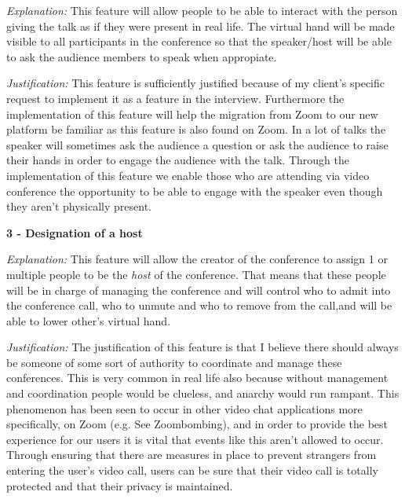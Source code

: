 \textit{Explanation:} This feature will allow people to be
able to interact with the
person giving the talk as if they were present in real life.
The virtual hand will be made visible to all participants in 
the conference so that the speaker/host will be able to ask 
the audience members to speak when appropiate.\\
\vspace{0.1cm}

\textit{Justification:} This feature
is sufficiently justified because of my client's specific 
request to implement it as a feature in the interview. 
Furthermore the implementation of this feature will help the 
migration from Zoom to our new platform be familiar as this 
feature is also found on Zoom. In a lot of talks the speaker
will sometimes ask the audience a question or ask the audience
to raise their hands in order to engage the audience with the
talk. Through the implementation of this feature we enable 
those who are attending via video conference the opportunity
to be able to engage with the speaker even though they aren't
physically present.

\vspace{0.2cm}

\textbf{3 - Designation of a host} \\ \vspace{0.1cm}

\textit{Explanation:} This feature will allow the creator of
the conference to assign 1 or multiple people to be the 
\textit{host} of the conference. That means that these
people will be in charge of 
managing the conference and will control who to admit into the
conference call, who to unmute and who to remove from the
call,and will be able to lower other's virtual hand. 
\vspace{0.1cm}

\textit{Justification:} The
justification of this feature is that I believe there should 
always be someone of some sort of authority to coordinate and 
manage these conferences. This is very common in real life
also because without management and coordination people
would be clueless, and anarchy would run rampant. This
phenomenon has been seen to occur in other video chat 
applications more specifically, on Zoom 
(e.g. See Zoombombing), and in order to provide the 
best experience for our users it is vital that events like 
this aren't allowed to occur. Through ensuring that there are
measures in place to prevent strangers from entering the
user's video call, users can be sure that their video call is
totally protected and that their privacy is maintained.

